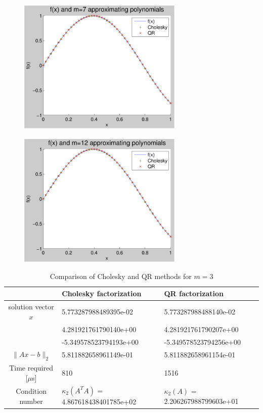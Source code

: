 \documentclass[11pt]{article} %
\begin{document}
\begin{figure}[h!]
  \centering
    \includegraphics[width=0.7\textwidth]{p3_m=7}
  \caption{}
\end{figure}

\begin{figure}[h!]
  \centering
    \includegraphics[width=0.7\textwidth]{p3_m=12}
  \caption{}
\end{figure}

\begin{table}[h!]
\centering
\begin{tabular}{| c | l | l | }\hline
 & Cholesky factorization & QR factorization \\ \hline
solution vector $x$ &5.773287988489395e-02 &     5.773287988488140e-02
 \\ 
& 4.281921761790140e+00 &      4.281921761790207e+00
\\
&-5.349578523794193e+00  &     -5.349578523794256e+00
\\ \hline
 $\|Ax - b \|_2$ &5.811882658961149e-01 &      5.811882658961154e-01
\\ \hline
Time required [$\mu$s] & 810 &1516 \\ \hline
Condition number & $\kappa_2(A^T A )$ = 4.867618438401785e+02& $\kappa_2(A )$ =     2.206267988799603e+01
 \\ \hline
\end{tabular}
\caption{Comparison of Cholesky and QR methods for $m=3$}
\end{table}
\end{document}
